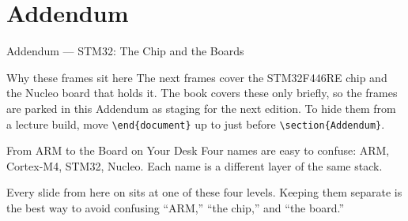 \documentclass[9pt,aspectratio=169,xcolor=table]{beamer}
\begin{document}
\section{Addendum}

\begin{frame}{Addendum --- STM32: The Chip and the Boards}
    \begin{block}{Why these frames sit here}
        The next frames cover the STM32F446RE chip and the Nucleo board that holds it. The book covers these only briefly, so the frames are parked in this Addendum as staging for the next edition. To hide them from a lecture build, move \texttt{\textbackslash end\{document\}} up to just before \texttt{\textbackslash section\{Addendum\}}.
    \end{block}
\end{frame}
\begin{frame}{From ARM to the Board on Your Desk}
    \leavevmode
    Four names are easy to confuse: ARM, Cortex-M4, STM32, Nucleo. Each name is a different layer of the same stack.

    \vspace{3mm}
    \begin{center}
    \end{center}

    \vspace{2mm}
    {\small\centering Every slide from here on sits at one of these four levels. Keeping them separate is the best way to avoid confusing ``ARM,'' ``the chip,'' and ``the board.''\par}
\end{frame}
\end{document}
